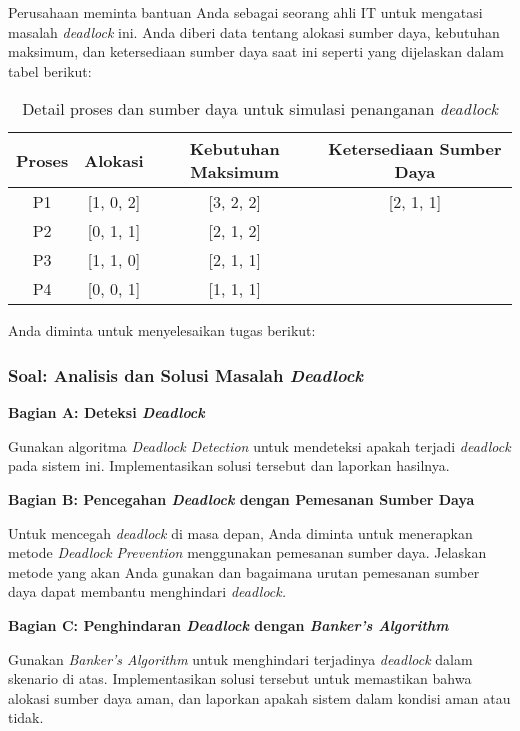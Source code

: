 \documentclass[12pt]{article}
\begin{document}
Perusahaan meminta bantuan Anda sebagai seorang ahli IT untuk mengatasi masalah \textit{deadlock} ini. Anda diberi data tentang alokasi sumber daya, kebutuhan maksimum, dan ketersediaan sumber daya saat ini seperti yang dijelaskan dalam tabel berikut:

\begin{table}[htbp]
    \centering
    \begin{tabular}{|c|c|c|c|}
    \hline
    Proses & Alokasi & Kebutuhan Maksimum & Ketersediaan Sumber Daya \\
    \hline
    P1 & [1, 0, 2] & [3, 2, 2] & [2, 1, 1] \\
    \hline
    P2 & [0, 1, 1] & [2, 1, 2] & \\
    \hline
    P3 & [1, 1, 0] & [2, 1, 1] & \\
    \hline
    P4 & [0, 0, 1] & [1, 1, 1] & \\
    \hline
    \end{tabular}
    \caption{Detail proses dan sumber daya untuk simulasi penanganan \textit{deadlock}}
    \label{tab:comprehensive_deadlock}
\end{table}

Anda diminta untuk menyelesaikan tugas berikut:

\subsubsection{Soal: Analisis dan Solusi Masalah \textit{Deadlock}}

\textbf{Bagian A: Deteksi \textit{Deadlock}}

Gunakan algoritma \textit{Deadlock Detection} untuk mendeteksi apakah terjadi \textit{deadlock} pada sistem ini. Implementasikan solusi tersebut dan laporkan hasilnya.

\textbf{Bagian B: Pencegahan \textit{Deadlock} dengan Pemesanan Sumber Daya}

Untuk mencegah \textit{deadlock} di masa depan, Anda diminta untuk menerapkan metode \textit{Deadlock Prevention} menggunakan pemesanan sumber daya. Jelaskan metode yang akan Anda gunakan dan bagaimana urutan pemesanan sumber daya dapat membantu menghindari \textit{deadlock.}

\textbf{Bagian C: Penghindaran \textit{Deadlock} dengan \textit{Banker's Algorithm}}

Gunakan \textit{Banker's Algorithm} untuk menghindari terjadinya \textit{deadlock} dalam skenario di atas. Implementasikan solusi tersebut untuk memastikan bahwa alokasi sumber daya aman, dan laporkan apakah sistem dalam kondisi aman atau tidak.
\end{document}
